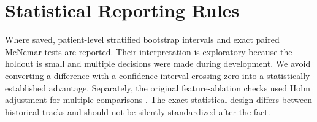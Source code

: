\section{Statistical Reporting Rules}
Where saved, patient-level stratified bootstrap intervals and exact paired McNemar tests are reported. Their interpretation is exploratory because the holdout is small and multiple decisions were made during development. We avoid converting a difference with a confidence interval crossing zero into a statistically established advantage. Separately, the original feature-ablation checks used Holm adjustment for multiple comparisons \cite{holm1979}. The exact statistical design differs between historical tracks and should not be silently standardized after the fact.
